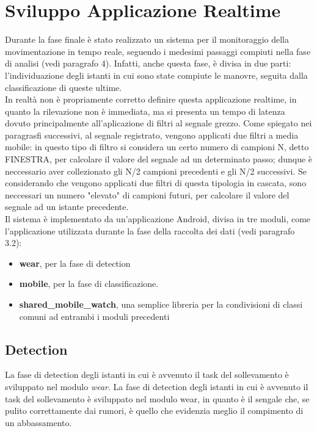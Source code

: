 \documentclass[a4paper]{article}
\begin{document}
\section{Sviluppo Applicazione Realtime}
Durante la fase finale è stato realizzato un sistema per il monitoraggio della movimentazione in tempo reale, seguendo i medesimi passaggi compiuti nella fase di analisi (vedi paragrafo 4). Infatti, anche questa fase, è divisa in due parti: l'individuazione degli istanti in cui sono state compiute le manovre, seguita dalla classificazione di queste ultime.\\
In realtà non è propriamente corretto definire questa applicazione realtime, in quanto la rilevazione non è immediata, ma si presenta un tempo di latenza dovuto principalmente all'aplicazione di filtri al segnale grezzo. Come spiegato nei paragrasfi successivi, al segnale registrato, vengono applicati due filtri a media mobile: in questo tipo di filtro si considera un certo numero di campioni N, detto FINESTRA, per calcolare il valore del segnale ad un determinato passo; dunque è neccessario aver collezionato gli N/2 campioni precedenti e gli N/2 successivi. Se considerando che vengono applicati due filtri di questa tipologia in cascata, sono neccessari un numero "elevato" di campioni futuri, per calcolare il valore del segnale ad un istante precedente.\\
Il sistema è implementato da un'applicazione Android, divisa in tre moduli, come l'applicazione utilizzata durante la fase della raccolta dei dati (vedi paragrafo 3.2): 
\begin {itemize}
\item \textbf{wear}, per la fase di detection
\item \textbf{mobile}, per la fase di classificazione.
\item \textbf{shared\_mobile\_watch}, una semplice libreria per la condivisioni di classi comuni ad entrambi i moduli precedenti \\
\end{itemize}


\subsection{Detection}
La fase di detection degli istanti in cui è avvenuto il task del sollevamento è sviluppato nel modulo \textit{wear}.
La fase di detection degli istanti in cui è avvenuto il task del sollevamento è sviluppato nel modulo wear, in quanto è il sengale che, se pulito correttamente dai rumori, è quello che evidenzia meglio il compimento di un abbassamento. 
\end{document}

